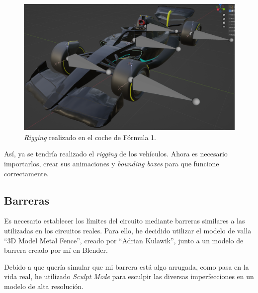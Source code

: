 \begin{figure}[H]
    \centering
    \includegraphics[width=\textwidth]{imagenes/rigging/f1-rigging.png}
    \caption{\textit{Rigging} realizado en el coche de Fórmula 1.}
    \label{fig:riggingf1}
\end{figure}

Así, ya se tendría realizado el \textit{rigging} de los vehículos. Ahora es necesario importarlos, crear sus animaciones y \textit{bounding boxes} para que funcione correctamente.

\subsection{Barreras}

Es necesario establecer los límites del circuito mediante barreras similares a las utilizadas en los circuitos reales. Para ello, he decidido utilizar el modelo de valla ``3D Model Metal Fence''\cite{fence}, creado por ``Adrian Kulawik'', junto a un modelo de barrera creado por mí en Blender.

\bigskip

Debido a que quería simular que mi barrera está algo arrugada, como pasa en la vida real, he utilizado \textit{Sculpt Mode} para esculpir las diversas imperfecciones en un modelo de alta resolución. 

